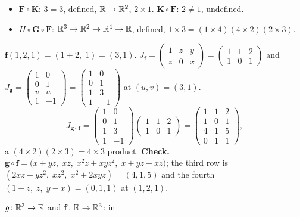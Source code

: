 \begin{solutions}
\begin{itemize}[leftmargin=1.2em,itemsep=0.2ex]
          \item $\mathbf{F}\circ\mathbf{K}$: $3=3$, defined, $\mathbb{R}\to\mathbb{R}^{2}$,
                $2\times1$. $\mathbf{K}\circ\mathbf{F}$: $2\neq1$,
                undefined.
          \item $H\circ\mathbf{G}\circ\mathbf{F}$: $\mathbb{R}^{3}\to\mathbb{R}^{2}\to\mathbb{R}^{4}
                \to\mathbb{R}$, defined, $1\times3=(1\times4)(4\times2)(2\times3)$.
        \end{itemize}
  \item $\mathbf{f}(1,2,1)=(1+2,\;1)=(3,1)$.
        $J_{\mathbf{f}}=\begin{pmatrix}1&z&y\\z&0&x\end{pmatrix}
        =\begin{pmatrix}1&1&2\\1&0&1\end{pmatrix}$ and
        $J_{\mathbf{g}}=\begin{pmatrix}1&0\\0&1\\v&u\\1&-1\end{pmatrix}
        =\begin{pmatrix}1&0\\0&1\\1&3\\1&-1\end{pmatrix}$ at $(u,v)=(3,1)$.
        \[
          J_{\mathbf{g}\circ\mathbf{f}}=
          \begin{pmatrix}1&0\\0&1\\1&3\\1&-1\end{pmatrix}
          \begin{pmatrix}1&1&2\\1&0&1\end{pmatrix}
          =\begin{pmatrix}1&1&2\\1&0&1\\4&1&5\\0&1&1\end{pmatrix},
        \]
        a $(4\times2)(2\times3)=4\times3$ product. \textbf{Check.}
        $\mathbf{g}\circ\mathbf{f}=\bigl(x+yz,\;xz,\;x^{2}z+xyz^{2},\;
        x+yz-xz\bigr)$; the third row is
        $(2xz+yz^{2},\;xz^{2},\;x^{2}+2xyz)=(4,1,5)$ and the fourth
        $(1-z,\;z,\;y-x)=(0,1,1)$ at $(1,2,1)$. \checkmark
  \item $g\colon\mathbb{R}^{3}\to\mathbb{R}$ and $\mathbf{f}\colon\mathbb{R}\to\mathbb{R}^{3}$: in

\end{solutions}
